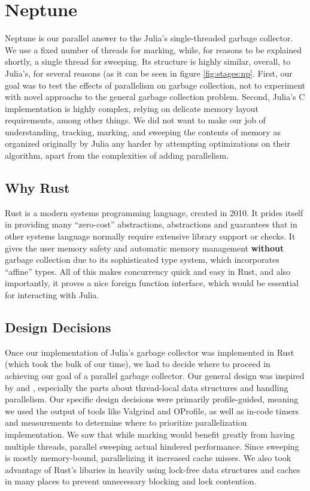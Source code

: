 \section{Neptune} \label{neptune}

Neptune is our parallel answer to the Julia's single-threaded garbage collector.
We use a fixed number of threads for marking, while, for reasons to be explained shortly, a single thread for sweeping.
Its structure is highly similar, overall, to Julia's, for several reasons (as it can be seen in figure \ref{fig:stages:np}.
First, our goal was to test the effects of parallelism on garbage collection, not to experiment with novel approachs to the general garbage collection problem.
Second, Julia's C implementation is highly complex, relying on delicate memory layout requirements, among other things.
We did not want to make our job of understanding, tracking, marking, and sweeping the contents of memory as organized originally by Julia any harder by attempting optimizations on their algorithm, apart from the complexities of adding parallelism.

\subsection{Why Rust}
Rust is a modern systems programming language, created in 2010.
It prides itself in providing many ``zero-cost'' abstractions, abstractions and guarantees that in other systems language normally require extensive library support or checks.
It gives the user memory safety and automatic memory management \textbf{without} garbage collection due to its sophisticated type system, which incorporates ``affine'' types.
All of this makes concurrency quick and easy in Rust, and also importantly, it proves a nice foreign function interface, which would be essential for interacting with Julia.

\subsection{Design Decisions}
Once our implementation of Julia's garbage collector was implemented in Rust (which took the bulk of our time), we had to decide where to proceed in achieving our goal of a parallel garbage collector.
Our general design was inspired by \cite{marlow2008parallel} and \cite{marlow2011multicore}, especially the parts about thread-local data structures and handling parallelism.
Our specific design decisions were primarily profile-guided, meaning we used the output of tools like Valgrind and OProfile, as well as in-code timers and measurements to determine where to prioritize parallelization implementation.
We saw that while marking would benefit greatly from having multiple threads, parallel sweeping actual hindered performance.
Since sweeping is mostly memory-bound, parallelizing it increased cache misses.
We also took advantage of Rust's libaries in heavily using lock-free data structures and caches in many places to prevent unnecessary blocking and lock contention.

